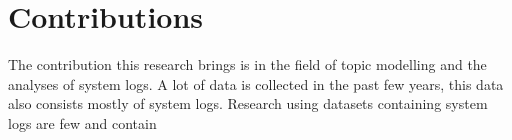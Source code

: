 \chapter{Contributions}  \label{ch:contributions}

The contribution this research brings is in the field of topic modelling and the analyses of system logs. A lot of data is collected in the past few years, this data also consists mostly of system logs. Research using datasets containing system logs are few and contain 